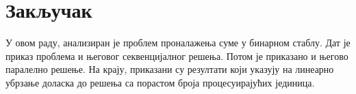 \section{Закључак}

У овом раду, анализиран је проблем проналажења суме у бинарном стаблу.
Дат је приказ проблема и његовог секвенцијалног решења.
Потом је приказано и његово паралелно решење.
На крају, приказани су резултати који указују на линеарно убрзање доласка до решења са порастом броја процесуирајућих јединица.